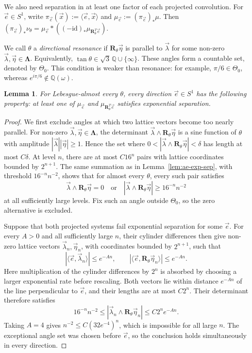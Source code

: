 \documentclass[scheme=plain]{ctexart}
\newtheorem{lemma}[theorem]{Lemma}
\begin{document}
We also need separation in at least one factor of each projected convolution.
For $\vec e\in S^1$, write $\pi_{\vec e}(\vec x):=\langle\vec e,\vec x\rangle$ and $\mu_{\vec e}:=(\pi_{\vec e})_*\mu$.
Then $(\pi_{\vec e})_*\nu_\theta=\mu_{\vec e}*((-\mathrm{id})_*\mu_{\mathbf R_\theta^T\vec e})$.

We call $\theta$ a \emph{directional resonance} if $\mathbf R_\theta\vec\eta$ is parallel to $\vec\lambda$ for some non-zero $\vec\lambda,\vec\eta\in\boldsymbol\Lambda$.
Equivalently, $\tan\theta\in\sqrt3\,\mathbb Q\cup\{\infty\}$.
These angles form a countable set, denoted by $\Theta_0$.
This condition is weaker than resonance: for example, $\pi/6\in\Theta_0$, whereas $e^{i\pi/6}\notin\mathbb Q(\omega)$.

\begin{lemma}
\label{lem:ae-dichotomy}
For Lebesgue-almost every $\theta$, every direction $\vec e\in S^1$ has the following property: at least one of $\mu_{\vec e}$ and $\mu_{\mathbf R_\theta^T\vec e}$ satisfies exponential separation.
\end{lemma}

\begin{proof}
We first exclude angles at which two lattice vectors become too nearly parallel.
For non-zero $\vec\lambda,\vec\eta\in\boldsymbol\Lambda$, the determinant $\vec\lambda\wedge\mathbf R_\theta\vec\eta$ is a sine function of $\theta$ with amplitude $|\vec\lambda||\vec\eta|\ge1$.
Hence the set where $0<|\vec\lambda\wedge\mathbf R_\theta\vec\eta|<\delta$ has length at most $C\delta$.
At level $n$, there are at most $C16^n$ pairs with lattice coordinates bounded by $2^{n+1}$.
The same summation as in Lemma~\ref{lem:ae-exp-sep}, with threshold $16^{-n}n^{-2}$, shows that for almost every $\theta$, every such pair satisfies
\[
\vec\lambda\wedge\mathbf R_\theta\vec\eta=0
\quad\text{or}\quad
|\vec\lambda\wedge\mathbf R_\theta\vec\eta|\ge16^{-n}n^{-2}
\]
at all sufficiently large levels.
Fix such an angle outside $\Theta_0$, so the zero alternative is excluded.

Suppose that both projected systems fail exponential separation for some $\vec e$.
For every $A>0$ and all sufficiently large $n$, their cylinder differences then give non-zero lattice vectors $\vec\lambda_n,\vec\eta_n$, with coordinates bounded by $2^{n+1}$, such that
\[
|\langle\vec e,\vec\lambda_n\rangle|\le e^{-An},
\qquad
|\langle\vec e,\mathbf R_\theta\vec\eta_n\rangle|\le e^{-An}.
\]
Here multiplication of the cylinder differences by $2^n$ is absorbed by choosing a larger exponential rate before rescaling.
Both vectors lie within distance $e^{-An}$ of the line perpendicular to $\vec e$, and their lengths are at most $C2^n$.
Their determinant therefore satisfies
\[
16^{-n}n^{-2}
\le |\vec\lambda_n\wedge\mathbf R_\theta\vec\eta_n|
\le C2^ne^{-An}.
\]
Taking $A=4$ gives $n^{-2}\le C(32e^{-4})^n$, which is impossible for all large $n$.
The exceptional angle set was chosen before $\vec e$, so the conclusion holds simultaneously in every direction.
\end{proof}
\end{document}
